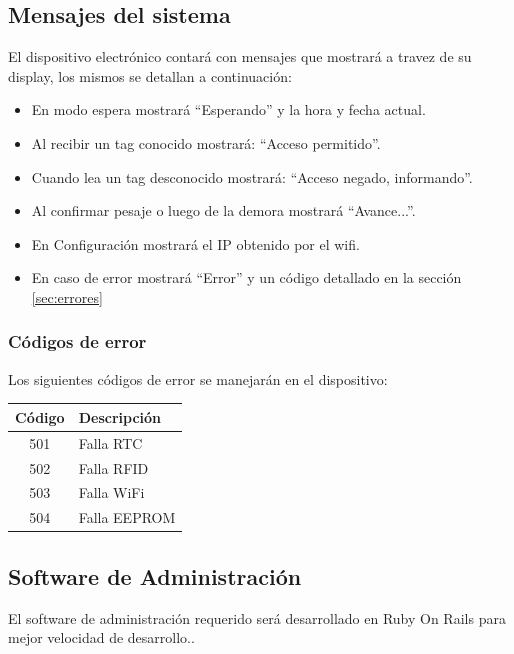 \subsection{Mensajes del sistema}
El dispositivo electrónico contará con mensajes que mostrará a travez de su display, los mismos se detallan a continuación:
\begin{itemize}
	\item En modo espera mostrará ``Esperando'' y la hora y fecha actual.
	\item Al recibir un tag conocido mostrará: ``Acceso permitido''.
	\item Cuando lea un tag desconocido mostrará: ``Acceso negado, informando''.
	\item Al confirmar pesaje o luego de la demora mostrará ``Avance...''.
	\item En Configuración mostrará el IP obtenido por el wifi. 
	\item En caso de error mostrará ``Error'' y un código detallado en la sección \ref{sec:errores}
\end{itemize}

\subsubsection{Códigos de error}
Los siguientes códigos de error se manejarán en el dispositivo:\label{sec:errores}\\
\begin{center}
	\begin{tabular}{|c|l|}
		\hline
		Código & Descripción \\
		\hline
		501 & Falla RTC\\
		502 & Falla RFID\\
		503 & Falla WiFi\\
		504 & Falla EEPROM\\
		\hline
	\end{tabular}
\end{center}
\subsection{Software de Administración}

El software de administraci\'on requerido ser\'a desarrollado en Ruby On Rails para mejor velocidad de desarrollo..
